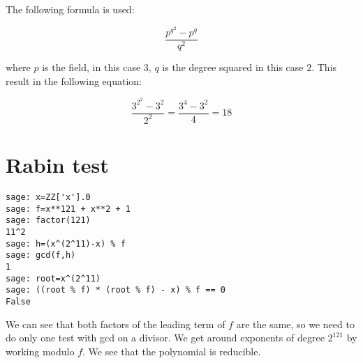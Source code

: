 \documentclass{article}
\begin{document}
The following formula is used:

\[
\frac{p^{q^2} - p^q}{q^2}
\]

where $p$ is the field, in this case $3$, $q$ is the degree squared in this case $2$.
This result in the following equation:

\[
\frac{3^{2^2} - 3^2}{2^2} = \frac{3^4 - 3^2}{4} = 18
\]

\section{Rabin test}
\begin{verbatim}
sage: x=ZZ['x'].0
sage: f=x**121 + x**2 + 1
sage: factor(121)
11^2
sage: h=(x^(2^11)-x) % f
sage: gcd(f,h)
1
sage: root=x^(2^11)
sage: ((root % f) * (root % f) - x) % f == 0
False
\end{verbatim}
We can see that both factors of the leading term of $f$ are the same, so we need to do only one test with gcd on a divisor.
We get around exponents of degree $2^{121}$ by working modulo $f$.
We see that the polynomial is reducible.
\end{document}
